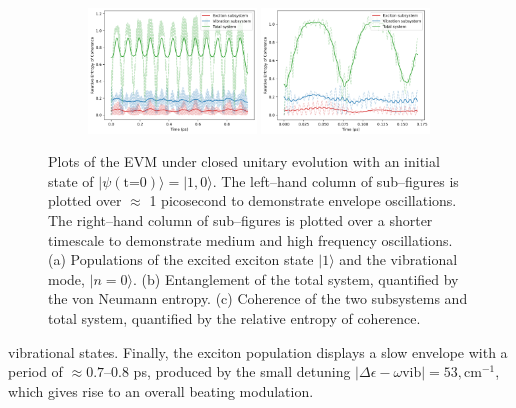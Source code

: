 \documentclass[11pt]{article}
\begin{document}
\begin{figure}[H]
    \vspace{0.8em}

    \begin{subfigure}{\textwidth}
        \centering
        \includegraphics[width=0.49\textwidth]{Research Project/Code/results/ExVib/Closed/Envelope/coh.png}
        \hfill
        \includegraphics[width=0.49\textwidth]{Research Project/Code/results/ExVib/Closed/Fast/coh.png}
        \caption{}
        \label{fig:EVM_CQS_Coh_e0}
    \end{subfigure}

    \caption{Plots of the EVM under closed unitary evolution with an initial state of $|\psi (\text{t=0})\rangle = |1, 0\rangle$. The left--hand column of sub--figures is plotted over $\approx$ 1 picosecond to demonstrate envelope oscillations. The right--hand column of sub--figures is plotted over a shorter timescale to demonstrate medium and high frequency oscillations. (a) Populations of the excited exciton state $|1\rangle$ and the vibrational mode, $|n=0\rangle$. (b) Entanglement of the total system, quantified by the von Neumann entropy. (c) Coherence of the two subsystems and total system, quantified by the relative entropy of coherence.} 
    \label{fig:EVM_CQS_e0}
\end{figure}

\noindent vibrational states. Finally, the exciton population displays a slow envelope with a period of $\approx0.7$–$0.8$ ps, produced by the small detuning $|\Delta\epsilon - \omega{\scriptscriptstyle \text{vib}}| = 53,\text{cm}^{-1}$, which gives rise to an overall beating modulation.
\end{document}
